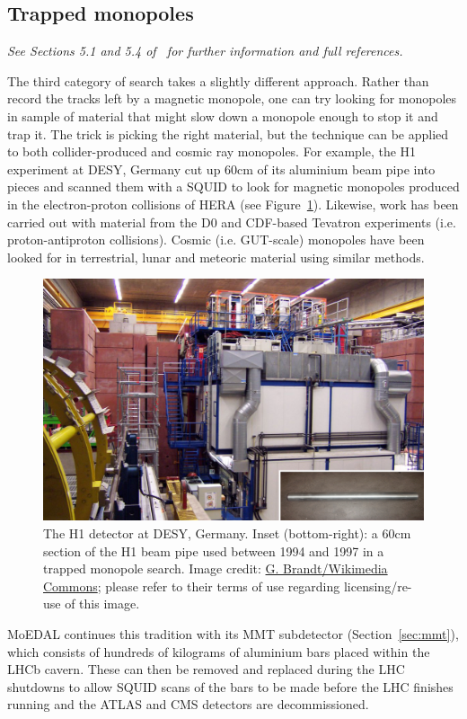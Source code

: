 \subsection{Trapped monopoles}
\label{sec:searchestrapped}
{\em See Sections 5.1 and 5.4 of~\cite{Patrizii2015} for further information
and full references.}

The third category of search takes a slightly different approach. 
Rather than record the tracks left by a magnetic monopole, 
one can try looking for monopoles in sample of material that might slow down 
a monopole enough to stop it and trap it.  
The trick is picking the right material, but the technique can be applied 
to both collider-produced and cosmic ray monopoles.  
For example, the H1 experiment at \acs{DESY}, Germany cut up 60cm of its 
aluminium beam pipe into pieces and scanned them with a \acf{SQUID}
to look for magnetic monopoles produced in the electron-proton collisions 
of \acs{HERA} (see Figure~\ref{fig:h1}).
Likewise, work has been carried out with material from the D0 and \acs{CDF}-based
Tevatron experiments (i.e. proton-antiproton collisions). 
Cosmic (i.e. \ac{GUT}-scale) monopoles have been looked for in terrestrial, 
lunar and meteoric material using similar methods.

%
\begin{figure}[htbp]
  \centering
  \includegraphics[width=1.0\textwidth]{assets/images/h1/h1.jpg}
  \caption[The H1 detector at DESY, Germany]
  {\label{fig:h1}The H1 detector at \ac{DESY}, Germany. %
Inset (bottom-right): a 60cm section of the H1 beam pipe used between 1994 %
and 1997 in a trapped monopole search. %
Image credit: \href{https://en.wikipedia.org/wiki/File:H1\_detector.jpg}{G. Brandt/Wikimedia Commons}; %
please refer to their terms of use regarding licensing/re-use of this image.}
\end{figure}
%

\ac{MoEDAL} continues this tradition with its \acf{MMT} subdetector (Section~\ref{sec:mmt}), 
which consists of hundreds of kilograms of aluminium bars placed within the \acs{LHCb} cavern.
These can then be removed and replaced during the \ac{LHC} shutdowns to allow \acs{SQUID}
scans of the bars to be made before the \ac{LHC} finishes running and the \ac{ATLAS} and \ac{CMS}
detectors are decommissioned.
